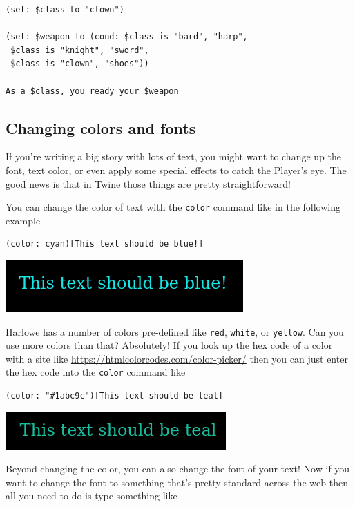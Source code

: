 \documentclass[a5paper,11pt]{article}
\begin{document}
\begin{verbatim}
(set: $class to "clown")

(set: $weapon to (cond: $class is "bard", "harp", 
 $class is "knight", "sword", 
 $class is "clown", "shoes"))
 
As a $class, you ready your $weapon
\end{verbatim}

\subsection{Changing colors and fonts}
If you're writing a big story with lots of text, you might want to change up the font, text color, or even apply some special effects to catch the Player's eye.  The good news is that in Twine those things are pretty straightforward!

You can change the color of text with the \verb"color" command like in the following example
\begin{verbatim}
(color: cyan)[This text should be blue!]
\end{verbatim}

\includegraphics[width=0.7\linewidth]{cyantext}


Harlowe has a number of colors pre-defined like \verb"red", \verb"white", or \verb"yellow". Can you use more colors than that? Absolutely! If you look up the hex code of a color with a site like \url{https://htmlcolorcodes.com/color-picker/} then you can just enter the hex code into the \verb"color" command like

\begin{verbatim}
(color: "#1abc9c")[This text should be teal]
\end{verbatim}

\includegraphics[width=0.7\linewidth]{tealtext}

Beyond changing the color, you can also change the font of your text! Now if you want to change the font to something that's pretty standard across the web then all you need to do is type something like
\end{document}
